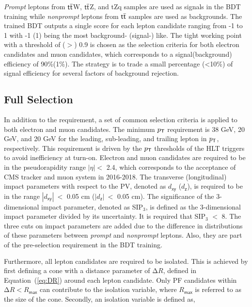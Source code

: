 \emph{Prompt} leptons from $\textsf{t}\overline{\textsf{t}}$W, $\textsf{t}\overline{\textsf{t}}$Z, and tZq samples are used as signals in the \ac{BDT} training while \emph{nonprompt} leptons from $\textsf{t}\overline{\textsf{t}}$ samples are used as backgrounds. The trained \ac{BDT} outputs a single score for each lepton candidate ranging from -1 to 1 with -1 (1) being the most background- (signal-) like. The tight working point with a threshold of ($>$) 0.9 is chosen as the selection criteria for both electron candidates and muon candidates, which corresponds to a signal(background) efficiency of 90\%(1\%). The strategy is to trade a small percentage (<10\%) of signal efficiency for several factors of background rejection. 
\subsection{Full Selection}
\label{subsec:FullSel}

In addition to the \TOP requirement, a set of common selection criteria is applied to both electron and muon candidates. The minimum $p_{\textsf{T}}$ requirement is 38 GeV, 20 GeV, and 20 GeV for the leading, sub-leading, and trailing lepton in $p_{\textsf{T}}$, respectively. This requirement is driven by the $p_{\textsf{T}}$ thresholds of the \ac{HLT} triggers to avoid inefficiency at turn-on. Electron and muon candidates are required to be in the pseudorapidity range $|\eta|<$ 2.4, which corresponds to the acceptance of \ac{CMS} tracker and muon system in 2016-2018. The transverse (longitudinal) impact parameters with respect to the \ac{PV}, denoted as $d_{\textsf{xy}}$ ($d_{\textsf{z}}$), is required to be in the range $|d_{\textsf{xy}}|~<$ 0.05 cm ($|d_{\textsf{z}}|~<$ 0.05 cm). The significance of the 3-dimensional impact parameter, denoted as SIP$_3$, is defined as the 3-dimensional impact parameter divided by its uncertainty. It is required that SIP$_3$ $<$ 8. The three cuts on impact parameters are added due to the difference in distributions of these parameters between \emph{prompt} and \emph{nonprompt} leptons. Also, they are part of the pre-selection requirement in the \ac{BDT} training.

Furthermore, all lepton candidates are required to be isolated. This is achieved by first defining a cone with a distance parameter of $\mathrm{\Delta}R$, defined in Equation~(\ref{eq:DR}) around each lepton candidate. Only \ac{PF} candidates within $\mathrm{\Delta}R<R_{\textsf{max}}$ can contribute to the isolation variable, where $R_{\textsf{max}}$ is referred to as the size of the cone. Secondly, an isolation variable is defined as,


